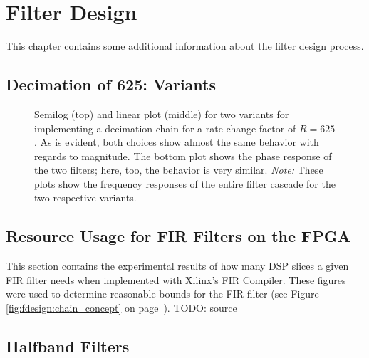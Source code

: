 \chapter{Filter Design} %
\label{ch:app:fdesign}

This  chapter contains  some additional  information about  the filter  design
process.

\section{Decimation of 625: Variants} %
\label{sec:dec625_variants}

\begin{figure}
    \centering
    
    \caption[Decimation Chain Variants for Rate of 625]{%
        Semilog  (top)  and   linear  plot  (middle)  for   two  variants  for
        implementing  a  decimation   chain  for  a  rate   change  factor  of
        $R=625$. As is  evident, both  choices show  almost the  same behavior
        with regards to magnitude. The bottom plot shows the phase response of
        the two filters; here, too, the behavior is very similar. \emph{Note:}
        These plots show the frequency  responses of the entire filter cascade
        for the two respective variants.%
    }
    \label{fig:dec625_variants}
\end{figure}


\section{Resource Usage for FIR Filters on the FPGA} %
\label{sec:fir_filter_resouce_usage}

This   section   contains  the   experimental   results   of  how   many   DSP
slices  a  given   FIR  filter  needs  when  implemented   with  Xilinx's  FIR
Compiler. These  figures were  used  to determine  reasonable  bounds for  the
FIR  filter    (see  Figure~  \ref{fig:fdesign:chain_concept}  on
page~\pageref{fig:fdesign:chain_concept}).
TODO: source




\section{Halfband Filters} %
\label{sec:halfband_filters}



